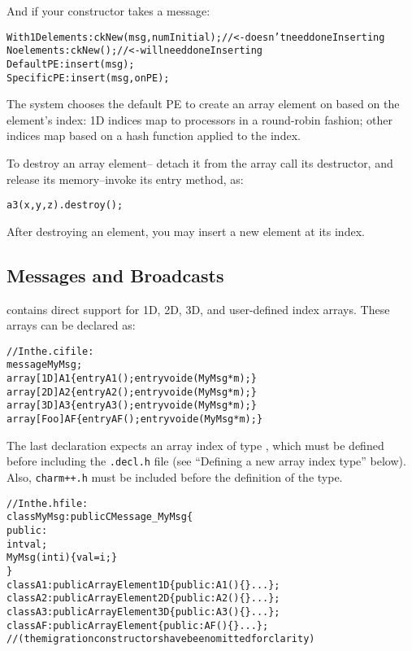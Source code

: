And if your constructor takes a message:

\begin{alltt}
With 1D elements: ckNew(msg, numInitial); //<- doesn't need doneInserting
No elements:      ckNew(); //<- will need doneInserting
Default PE:       insert(msg);
Specific PE:      insert(msg,onPE);
\end{alltt}

The system chooses the default PE to create an array element on
based on the element's index: 1D indices map to processors in
a round-robin fashion; other indices map based on a hash function
applied to the index.

To destroy an array element-- detach it from the array
call its destructor, and release its memory--invoke its  
entry method, as:

\begin{alltt}
a3(x,y,z).destroy();
\end{alltt}

After destroying an element, you may insert a new element at
its index.

\subsection{Messages and Broadcasts}

\charmpp{} contains direct support for 1D, 2D, 3D, and user-defined
index arrays.  These arrays can be declared as:

\begin{alltt}
//In the .ci file:
message MyMsg;
array [1D] A1 \{ entry A1(); entry void e(MyMsg *m);\}
array [2D] A2 \{ entry A2(); entry void e(MyMsg *m);\}
array [3D] A3 \{ entry A3(); entry void e(MyMsg *m);\}
array [Foo] AF \{ entry AF(); entry void e(MyMsg *m);\}
\end{alltt}

The last declaration expects an array index of type ,
which must be defined before including the \texttt{.decl.h} file 
(see ``Defining a new array index type'' below).  
Also, \texttt{charm++.h} must be included before the definition of the 
 type. 

\begin{alltt}
//In the .h file:
class MyMsg: public CMessage_MyMsg \{
public: 
  int val;
  MyMsg(int i) \{val=i;\}
\}
class A1:public ArrayElement1D \{ public: A1()\{\} ...\};
class A2:public ArrayElement2D \{ public: A2()\{\} ...\};
class A3:public ArrayElement3D \{ public: A3()\{\} ...\};
class AF:public ArrayElement \{ public: AF()\{\} ...\};
//(the migration constructors have been omitted for clarity)
\end{alltt}

